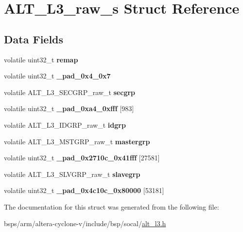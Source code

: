 \hypertarget{structALT__L3__raw__s}{}\section{A\+L\+T\+\_\+\+L3\+\_\+raw\+\_\+s Struct Reference}
\label{structALT__L3__raw__s}
\subsection*{Data Fields}
\begin{DoxyCompactItemize}
\item 
\mbox{\label{structALT__L3__raw__s_a0711b0a3237b67ab52691beef2db4b3e}} 
volatile uint32\+\_\+t {\bfseries remap}
\item 
\mbox{\label{structALT__L3__raw__s_ab71d6015d04726e699e67112751ebc5b}} 
volatile uint32\+\_\+t {\bfseries \+\_\+pad\+\_\+0x4\+\_\+0x7}
\item 
\mbox{\label{structALT__L3__raw__s_a6d787058c83fca1b0a1abbe8de5b684d}} 
volatile A\+L\+T\+\_\+\+L3\+\_\+\+S\+E\+C\+G\+R\+P\+\_\+raw\+\_\+t {\bfseries secgrp}
\item 
\mbox{\label{structALT__L3__raw__s_a929c33357169247222551fa911a750e2}} 
volatile uint32\+\_\+t {\bfseries \+\_\+pad\+\_\+0xa4\+\_\+0xfff} \mbox{[}983\mbox{]}
\item 
\mbox{\label{structALT__L3__raw__s_a1e3f0de625dba91711fafac82dda4439}} 
volatile A\+L\+T\+\_\+\+L3\+\_\+\+I\+D\+G\+R\+P\+\_\+raw\+\_\+t {\bfseries idgrp}
\item 
\mbox{\label{structALT__L3__raw__s_ae1b9932bc62776efdbb20b5c5326db74}} 
volatile A\+L\+T\+\_\+\+L3\+\_\+\+M\+S\+T\+G\+R\+P\+\_\+raw\+\_\+t {\bfseries mastergrp}
\item 
\mbox{\label{structALT__L3__raw__s_a2bed0148e620729267d4eabf39cac374}} 
volatile uint32\+\_\+t {\bfseries \+\_\+pad\+\_\+0x2710c\+\_\+0x41fff} \mbox{[}27581\mbox{]}
\item 
\mbox{\label{structALT__L3__raw__s_a98db40ba48d71aa30253753314e31412}} 
volatile A\+L\+T\+\_\+\+L3\+\_\+\+S\+L\+V\+G\+R\+P\+\_\+raw\+\_\+t {\bfseries slavegrp}
\item 
\mbox{\label{structALT__L3__raw__s_af005179b1429fcf133a707fe9e77a807}} 
volatile uint32\+\_\+t {\bfseries \+\_\+pad\+\_\+0x4c10c\+\_\+0x80000} \mbox{[}53181\mbox{]}
\end{DoxyCompactItemize}


The documentation for this struct was generated from the following file\+:\begin{DoxyCompactItemize}
\item 
bsps/arm/altera-\/cyclone-\/v/include/bsp/socal/\mbox{\hyperlink{alt__l3_8h}{alt\+\_\+l3.\+h}}\end{DoxyCompactItemize}
